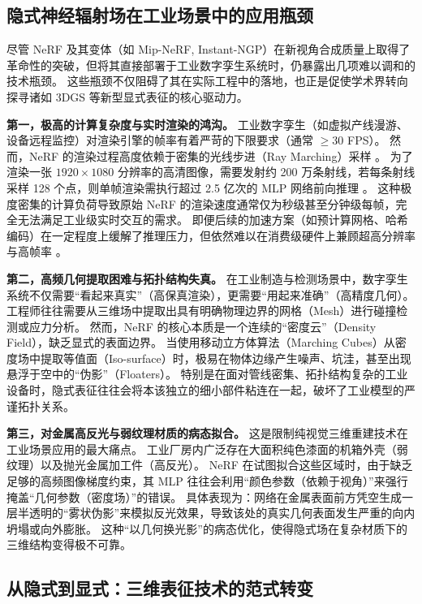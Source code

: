 \subsection{隐式神经辐射场在工业场景中的应用瓶颈}
\label{subsec:nerf_bottlenecks}

尽管 NeRF 及其变体（如 Mip-NeRF, Instant-NGP）在新视角合成质量上取得了革命性的突破，但将其直接部署于工业数字孪生系统时，仍暴露出几项难以调和的技术瓶颈。
这些瓶颈不仅阻碍了其在实际工程中的落地，也正是促使学术界转向探寻诸如 3DGS 等新型显式表征的核心驱动力。

\textbf{第一，极高的计算复杂度与实时渲染的鸿沟。}
工业数字孪生（如虚拟产线漫游、设备远程监控）对渲染引擎的帧率有着严苛的下限要求（通常 $\ge 30$ FPS）。
然而，NeRF 的渲染过程高度依赖于密集的光线步进（Ray Marching）采样 。
为了渲染一张 $1920 \times 1080$ 分辨率的高清图像，需要发射约 200 万条射线，若每条射线采样 128 个点，则单帧渲染需执行超过 2.5 亿次的 MLP 网络前向推理 。
这种极度密集的计算负荷导致原始 NeRF 的渲染速度通常仅为秒级甚至分钟级每帧，完全无法满足工业级实时交互的需求。
即便后续的加速方案（如预计算网格、哈希编码）在一定程度上缓解了推理压力，但依然难以在消费级硬件上兼顾超高分辨率与高帧率 。

\textbf{第二，高频几何提取困难与拓扑结构失真。}
在工业制造与检测场景中，数字孪生系统不仅需要“看起来真实”（高保真渲染），更需要“用起来准确”（高精度几何）。
工程师往往需要从三维场中提取出具有明确物理边界的网格（Mesh）进行碰撞检测或应力分析。
然而，NeRF 的核心本质是一个连续的“密度云”（Density Field），缺乏显式的表面边界。
当使用移动立方体算法（Marching Cubes）从密度场中提取等值面（Iso-surface）时，极易在物体边缘产生噪声、坑洼，甚至出现悬浮于空中的“伪影”（Floaters）。
特别是在面对管线密集、拓扑结构复杂的工业设备时，隐式表征往往会将本该独立的细小部件粘连在一起，破坏了工业模型的严谨拓扑关系。

\textbf{第三，对金属高反光与弱纹理材质的病态拟合。}
这是限制纯视觉三维重建技术在工业场景应用的最大痛点。
工业厂房内广泛存在大面积纯色漆面的机箱外壳（弱纹理）以及抛光金属加工件（高反光）。
NeRF 在试图拟合这些区域时，由于缺乏足够的高频图像梯度约束，其 MLP 往往会利用“颜色参数（依赖于视角）”来强行掩盖“几何参数（密度场）”的错误。
具体表现为：网络在金属表面前方凭空生成一层半透明的“雾状伪影”来模拟反光效果，导致该处的真实几何表面发生严重的向内坍塌或向外膨胀。
这种“以几何换光影”的病态优化，使得隐式场在复杂材质下的三维结构变得极不可靠。

\subsection{从隐式到显式：三维表征技术的范式转变}
\label{subsec:paradigm_shift}

